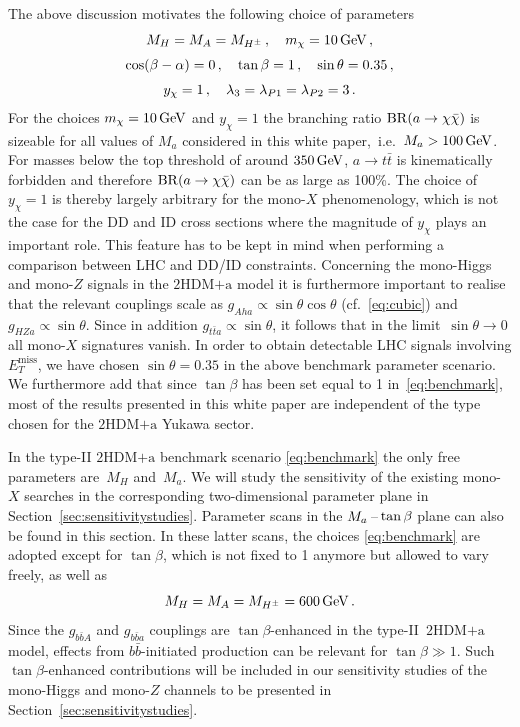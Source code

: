 \documentclass[a4paper, 11pt,notoc]{article}
\newcommand{\MET}{\ensuremath{E_T^\mathrm{miss}}\xspace}
\newcommand{\hdma}{\ensuremath{\textrm{2HDM+a}}\xspace}
\begin{document}
The above discussion motivates the following choice of parameters
\begin{gather} 
 M_H  = M_A = M_{H^\pm} \,, \quad m_\chi = 10 \, {\rm GeV} \,,\notag  \\[1mm]
\cos (\beta - \alpha) = 0\,, \quad   \tan \beta = 1\,, \quad  \sin\theta = 0.35\,, \label{eq:benchmark} \\[1mm]
y_\chi  = 1\,, \quad \lambda_3 =  \lambda_{P1} = \lambda_{P2} =3 \,. \notag 
\end{gather}
For the choices $m_\chi = 10 \, {\rm GeV}$ and $y_\chi  = 1$ the  branching ratio ${\rm BR} (a \to \chi \bar \chi)$ is sizeable for all values of $M_a$ considered in this white paper,~i.e.~$M_a > 100 \, {\rm GeV}$. For masses below the top threshold of around $350 \, {\rm GeV}$, $a \to t \bar t$ is  kinematically forbidden and therefore ${\rm BR} (a \to \chi \bar \chi)$ can be as large as 100\%.  The choice of~$y_\chi  = 1$ is thereby largely arbitrary for the mono-$X$ phenomenology, which is not the case for the DD and ID cross sections where the magnitude of $y_\chi$ plays an important role. This feature  has to be  kept in mind when performing a comparison between LHC and DD/ID constraints. Concerning the mono-Higgs and mono-$Z$ signals in the \hdma model it is furthermore important to realise that the relevant couplings scale as $g_{Aha} \propto \sin \theta \cos \theta$  (cf.~\eqref{eq:cubic}) and $g_{HZa} \propto \sin \theta$. Since in addition $g_{t \bar t a} \propto \sin \theta$,  it follows that in the limit~$\sin \theta \to 0$ all mono-$X$ signatures vanish. In order to obtain detectable LHC signals involving $\MET$, we have chosen $\sin\theta = 0.35$ in the above benchmark parameter scenario. We furthermore add that since $\tan \beta$ has been set equal to 1 in~\eqref{eq:benchmark}, most of the results presented in this white paper are independent of the type chosen for the \hdma Yukawa sector. 

In the  type-II \hdma  benchmark scenario \eqref{eq:benchmark} the only free parameters are~$M_H$ and~$M_a$. We will study the sensitivity of the existing mono-$X$ searches in the corresponding two-dimensional parameter plane in Section~\ref{sec:sensitivitystudies}. Parameter scans in the $M_a\hspace{0.5mm}$--$\hspace{0.5mm}\tan \beta$ plane can also be found in this section.  In these latter scans, the choices \eqref{eq:benchmark} are adopted except for $\tan \beta$, which is not fixed to 1 anymore but allowed to vary freely, as well as    
\begin{equation} \label{eq:matbscan}
M_H  = M_A = M_{H^\pm} =  600 \, {\rm GeV} \,.
\end{equation} 
Since the $g_{b \bar b A}$ and $g_{b \bar b a}$ couplings are $\tan \beta$-enhanced in the type-II~\hdma model,  effects from $b \bar b$-initiated production can be relevant  for $\tan \beta \gg 1$. Such $\tan \beta$-enhanced contributions will be included in our sensitivity studies of the mono-Higgs and mono-$Z$ channels to be presented in Section~\ref{sec:sensitivitystudies}. 
\end{document}
